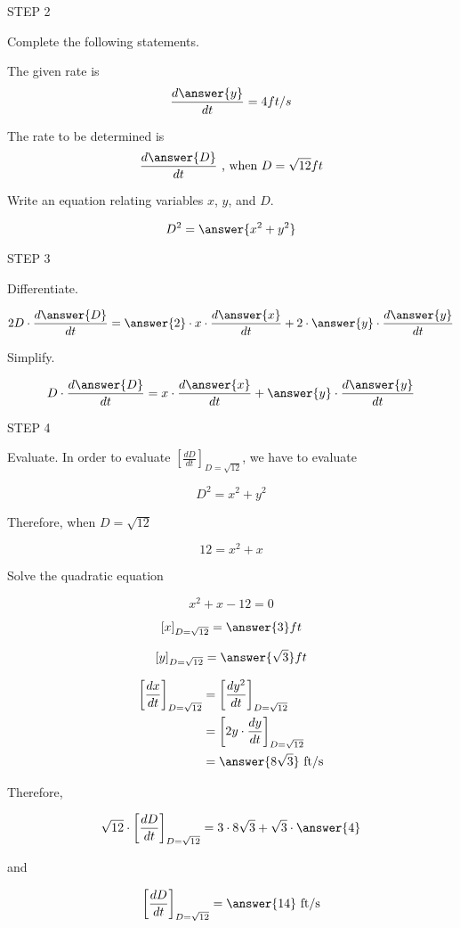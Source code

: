 \documentclass{ximera}
\begin{document}
\begin{exercise}
STEP 2

Complete the following statements.

The given rate is
 \[
\frac{d\answer{y}}{dt}= 4 ft/s
\]

The  rate to be determined is
\[
\dfrac{d\answer{D}}{dt} \text{    , when    } D=\sqrt{12} ft
\]

Write an equation relating variables $x$, $y$, and  $D$.

\[
D^2=\answer{x^2+y^2}
\]

STEP 3

Differentiate.

\[
2 D\cdot \frac{d\answer{D}}{dt}=\answer{2}\cdot x\cdot  \dfrac{d\answer{x}}{dt}+2\cdot\answer{y}\cdot  \frac{d\answer{y}}{dt}
\]

Simplify.

\[
 D\cdot \dfrac{d\answer{D}}{dt}=x\cdot  \frac{d\answer{x}}{dt}+\answer{y}\cdot  \frac{d\answer{y}}{dt} 
\]


STEP 4

Evaluate. In order to evaluate $\left[\frac{dD}{dt}\right]_{D=\sqrt{12}}$, we have to evaluate


\begin{hint}
\[
D^2=x^2+y^2
\]

Therefore, when $D=\sqrt{12}$

\[
12=x^2+x
\]


Solve the quadratic equation

\[
x^2+x-12=0
\]
\end{hint}


\[
\left[x\right]_{D=\sqrt{12}}=\answer{3} ft
\]

\[
\left[y\right]_{D=\sqrt{12}}=\answer{\sqrt{3}} ft
\]


\begin{align}
\left[\frac{dx}{dt}\right]_{D=\sqrt{12}}&=\left[\frac{dy^2}{dt}\right]_{D=\sqrt{12}}\\
&=\left[2y\cdot \frac{dy}{dt}\right]_{D=\sqrt{12}}\\
&=\answer{8\sqrt{3}}\text{   ft/s}\\
\end{align}

Therefore,

\[
 \sqrt{12}\cdot \left[\frac{dD}{dt}\right]_{D=\sqrt{12}}=3\cdot  8\sqrt{3}+\sqrt{3}\cdot {\answer{4}}
\]


and

\[
 \left[\frac{dD}{dt}\right]_{D=\sqrt{12}}= \answer{14} \text{  ft/s}
\]
\end{exercise}
\end{document}
